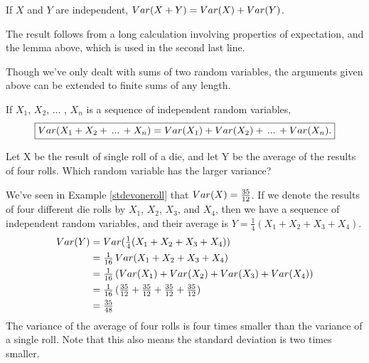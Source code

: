 \begin{thm}\label{VarianceIndependentSum} If $X$ and $Y$ are independent, $Var(X+Y) = Var(X) + Var(Y)$.
\end{thm}
\begin{pf} The result follows from a long calculation involving properties of expectation, and the lemma above, which is used in the second last line.
\end{pf}

Though we've only dealt with sums of two random variables, the arguments given above can be extended to finite sums of any length.

\begin{cor}\label{expectationandvarianceofindependentsum}If $X_1$, $X_2$, ... , $X_n$ is a sequence of independent random variables,
$$\boxed{Var(X_1 + X_2 + \, ... \, + X_n) = Var(X_1) + Var(X_2) + \, ... \, + Var(X_n).}$$
\end{cor}

\begin{examp}Let X be the result of single roll of a die, and let Y be the average of the results of four rolls. Which random variable has the larger variance?

\noindent We've seen in Example \ref{stdevoneroll} that $Var(X) = \frac{35}{12}$. If we denote the results of four different die rolls by $X_1$, $X_2$, $X_3$, and $X_4$, then we have a sequence of independent random variables, and their average is $Y = \frac{1}{4}(X_1 + X_2 + X_3 + X_4)$.
$$\begin{aligned}Var(Y) &= Var(\textstyle\frac{1}{4}(X_1 + X_2 + X_3 + X_4)) \\
&= \textstyle\frac{1}{16}\,Var(X_1 + X_2 + X_3 + X_4) \\
&= \textstyle\frac{1}{16}\,(Var(X_1) + Var(X_2) + Var(X_3) + Var(X_4)) \\
&= \textstyle\frac{1}{16}\,(\frac{35}{12} + \frac{35}{12} + \frac{35}{12} + \frac{35}{12}) \\
&= \textstyle\frac{35}{48} \\
\end{aligned}$$
The variance of the average of four rolls is four times smaller than the variance of a single roll. Note that this also means the standard deviation is two times smaller.
\end{examp}

